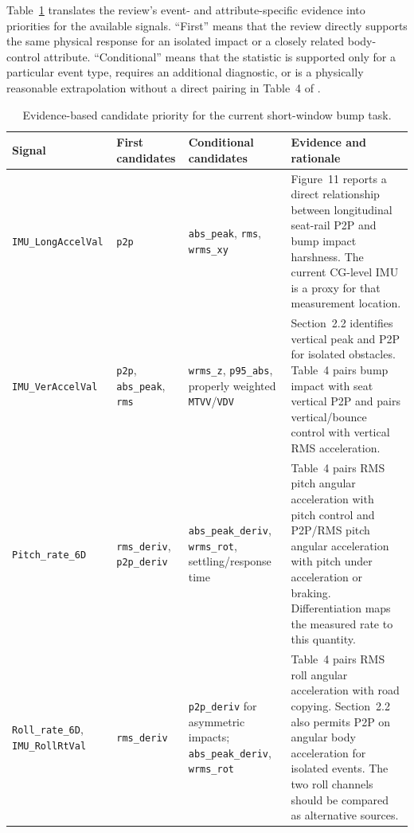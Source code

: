 \documentclass[letterpaper,journal]{IEEEtran}
\begin{document}
Table~\ref{tab:bump-priority} translates the review's event- and attribute-specific evidence
into priorities for the available signals. ``First'' means that the review directly supports the
same physical response for an isolated impact or a closely related body-control attribute.
``Conditional'' means that the statistic is supported only for a particular event type, requires
an additional diagnostic, or is a physically reasonable extrapolation without a direct pairing in
Table~4 of \cite{guastadisegni2024}.

\begin{table}[t]
\centering
\caption{Evidence-based candidate priority for the current short-window bump task.}
\label{tab:bump-priority}
\begingroup
\setlength{\tabcolsep}{3pt}
\small
\begin{tabular}{@{}
>{\raggedright\arraybackslash}p{}
>{\raggedright\arraybackslash}p{}
>{\raggedright\arraybackslash}p{}
>{\raggedright\arraybackslash}p{}@{}}
\toprule
Signal & First candidates & Conditional candidates & Evidence and rationale \\
\midrule
\texttt{IMU\_LongAccelVal}
& \texttt{p2p}
& \texttt{abs\_peak}, \texttt{rms}, \texttt{wrms\_xy}
& Figure~11 reports a direct relationship between longitudinal seat-rail P2P and bump impact harshness. The current CG-level IMU is a proxy for that measurement location. \\

\texttt{IMU\_VerAccelVal}
& \texttt{p2p}, \texttt{abs\_peak}, \texttt{rms}
& \texttt{wrms\_z}, \texttt{p95\_abs}, properly weighted \texttt{MTVV}/\texttt{VDV}
& Section~2.2 identifies vertical peak and P2P for isolated obstacles. Table~4 pairs bump impact with seat vertical P2P and pairs vertical/bounce control with vertical RMS acceleration. \\

\texttt{Pitch\_rate\_6D}
& \texttt{rms\_deriv}, \texttt{p2p\_deriv}
& \texttt{abs\_peak\_deriv}, \texttt{wrms\_rot}, settling/response time
& Table~4 pairs RMS pitch angular acceleration with pitch control and P2P/RMS pitch angular acceleration with pitch under acceleration or braking. Differentiation maps the measured rate to this quantity. \\

\texttt{Roll\_rate\_6D},
\texttt{IMU\_RollRtVal}
& \texttt{rms\_deriv}
& \texttt{p2p\_deriv} for asymmetric impacts; \texttt{abs\_peak\_deriv}, \texttt{wrms\_rot}
& Table~4 pairs RMS roll angular acceleration with road copying. Section~2.2 also permits P2P on angular body acceleration for isolated events. The two roll channels should be compared as alternative sources. \\


\end{tabular}
\end{table}
\end{document}
